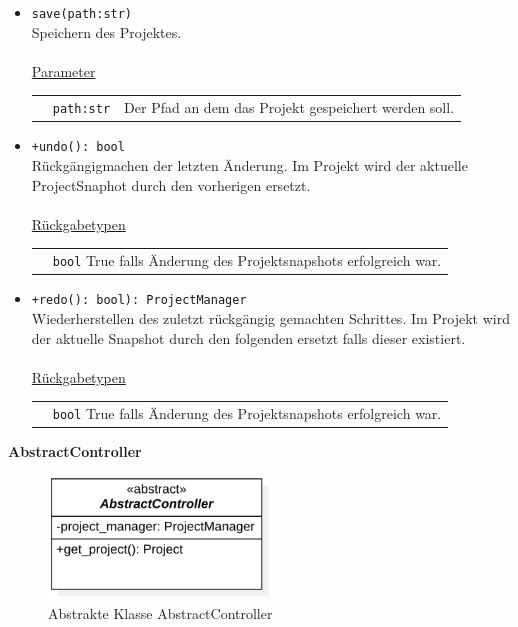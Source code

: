 \documentclass{article}
\begin{document}
\begin{itemize}
\begin{itemize}
\item \texttt{save(path:str)}\\ Speichern des Projektes.\\\\
\underline{{Parameter}}\\
\begin{tabular}{lll}
 & \texttt{path:str} & Der Pfad an dem das Projekt gespeichert werden soll. \\
\end{tabular}
\item \texttt{+undo(): bool}\\ Rückgängigmachen der letzten Änderung. Im Projekt wird der aktuelle ProjectSnaphot durch den vorherigen ersetzt.\\\\
\underline{{Rückgabetypen}}\\
\begin{tabular}{lp{10.7cm}}
 & \texttt{bool}  True falls Änderung des Projektsnapshots erfolgreich war.\\
\end{tabular}
\item \texttt{+redo(): bool): ProjectManager}\\ Wiederherstellen des zuletzt rückgängig gemachten Schrittes. Im Projekt wird der aktuelle Snapshot durch den folgenden ersetzt falls dieser existiert.\\\\
\underline{{Rückgabetypen}}\\
\begin{tabular}{lp{10.7cm}}
 & \texttt{bool}  True falls Änderung des Projektsnapshots erfolgreich war.\\
\end{tabular}
\end{itemize}


\newpage
\textbf{\large{AbstractController}}
\begin{figure}[H]%
    \centering
    \includegraphics[width=6cm]{entwurf/Floriane/AbstractController.png}
    \caption{Abstrakte Klasse AbstractController}
\end{figure}



\end{itemize}
\end{document}
